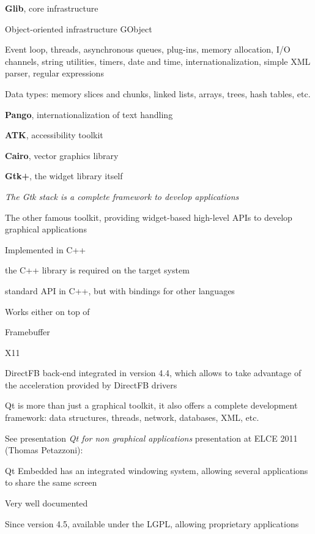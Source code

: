   \startitemize
  \item {\bf Glib}, core infrastructure
    \startitemize
    \item Object-oriented infrastructure GObject
    \item Event loop, threads, asynchronous queues, plug-ins, memory
      allocation, I/O channels, string utilities, timers, date and
      time, internationalization, simple XML parser, regular
      expressions
    \item Data types: memory slices and chunks, linked lists, arrays,
      trees, hash tables, etc.
    \stopitemize
  \item {\bf Pango}, internationalization of text handling
  \item {\bf ATK}, accessibility toolkit
  \item {\bf Cairo}, vector graphics library
  \item {\bf Gtk+}, the widget library itself
  \item {\em The Gtk stack is a complete framework to develop applications}
  \stopitemize

  \startitemize
  \item The other famous toolkit, providing widget-based high-level APIs to
    develop graphical applications
  \item Implemented in C++
    \startitemize
    \item the C++ library is required on the target system
    \item standard API in C++, but with bindings for other languages
    \stopitemize
  \item Works either on top of
    \startitemize
    \item Framebuffer
    \item X11
    \item DirectFB back-end integrated in version 4.4, which allows to take
      advantage of the acceleration provided by DirectFB drivers
    \stopitemize
  \stopitemize

  \startitemize
  \item Qt is more than just a graphical toolkit, it also offers a
    complete development framework: data structures, threads, network,
    databases, XML, etc.
  \item See presentation {\em Qt for non graphical applications}
    presentation at ELCE 2011 (Thomas Petazzoni):
  \item Qt Embedded has an integrated windowing system, allowing
    several applications to share the same screen
  \item Very well documented
  \item Since version 4.5, available under the LGPL, allowing
    proprietary applications
  \stopitemize

